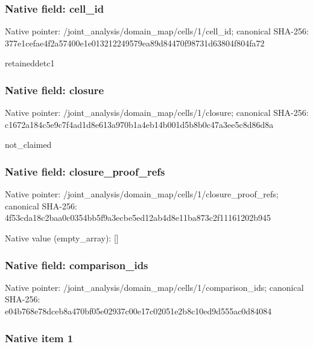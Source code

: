 \documentclass[10pt,a4paper]{article}
\begin{document}
\subsubsection{Native field: cell\_id}


Native pointer: /joint\_analysis/domain\_m\allowbreak{}ap/cells/1/cell\_id; canonical SHA-256: 377e1cefae4f2a57400e1e01\allowbreak{}3212249579ea89d84470f987\allowbreak{}31d63804f804fa72


retaineddetc1


\subsubsection{Native field: closure}


Native pointer: /joint\_analysis/domain\_m\allowbreak{}ap/cells/1/closure; canonical SHA-256: c1672a184c5e9c7f4ad1d8e6\allowbreak{}13a970b1a4eb14b001d5b8b0\allowbreak{}c47a3ee5c8d86d8a


not\_claimed


\subsubsection{Native field: closure\_proof\_refs}


Native pointer: /joint\_analysis/domain\_m\allowbreak{}ap/cells/1/closure\_proof\allowbreak{}\_refs; canonical SHA-256: 4f53cda18c2baa0c0354bb5f\allowbreak{}9a3ecbe5ed12ab4d8e11ba87\allowbreak{}3c2f11161202b945



Native value (empty\_array): []



\subsubsection{Native field: comparison\_ids}


Native pointer: /joint\_analysis/domain\_m\allowbreak{}ap/cells/1/comparison\_id\allowbreak{}s; canonical SHA-256: e04b768e78dceb8a470bf05e\allowbreak{}02937c00e17c02051e2b8c10\allowbreak{}ed9d555ac0d84084



\subsubsection{Native item 1}
\end{document}
